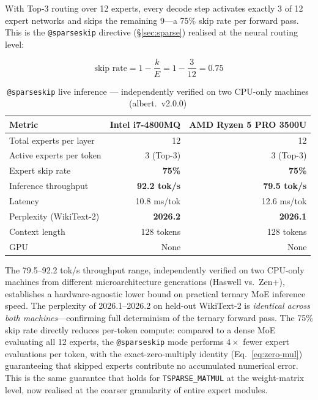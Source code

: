 \documentclass[11pt,a4paper]{article}
\begin{document}
With Top-3 routing over 12 experts, every decode step activates exactly 3 of 12
expert networks and skips the remaining 9---a 75\% skip rate per forward pass.
This is the \texttt{@sparseskip} directive (\S\ref{sec:sparse}) realised at the
neural routing level:

\begin{equation}
  \text{skip rate} = 1 - \frac{k}{E} = 1 - \frac{3}{12} = 0.75
  \label{eq:skip_rate}
\end{equation}

\begin{table}[htbp]
\centering
\small
\caption{\texttt{@sparseskip} live inference --- independently verified on two CPU-only machines (albert.\ v2.0.0)}
\label{tab:sparseskip_live}
\begin{tabular}{lrr}
\toprule
Metric & Intel i7-4800MQ & AMD Ryzen 5 PRO 3500U \\
\midrule
Total experts per layer & 12 & 12 \\
Active experts per token & 3 (Top-3) & 3 (Top-3) \\
Expert skip rate & \textbf{75\%} & \textbf{75\%} \\
Inference throughput & \textbf{92.2 tok/s} & \textbf{79.5 tok/s} \\
Latency & 10.8 ms/tok & 12.6 ms/tok \\
Perplexity (WikiText-2) & \textbf{2026.2} & \textbf{2026.1} \\
Context length & 128 tokens & 128 tokens \\
GPU & None & None \\
\bottomrule
\end{tabular}
\end{table}

The 79.5--92.2 tok/s throughput range, independently verified on two CPU-only
machines from different microarchitecture generations (Haswell vs.\ Zen+), establishes
a hardware-agnostic lower bound on practical ternary MoE inference speed. The
perplexity of 2026.1--2026.2 on held-out WikiText-2 is \emph{identical across both
machines}---confirming full determinism of the ternary forward pass. The 75\%
skip rate directly reduces per-token compute: compared to a dense MoE evaluating
all 12 experts, the \texttt{@sparseskip} mode performs $4\times$ fewer expert
evaluations per token, with the exact-zero-multiply identity
(Eq.~\ref{eq:zero-mul}) guaranteeing that skipped experts contribute no accumulated
numerical error. This is the same guarantee that holds for \texttt{TSPARSE\_MATMUL}
at the weight-matrix level, now realised at the coarser granularity of entire expert
modules.
\end{document}
